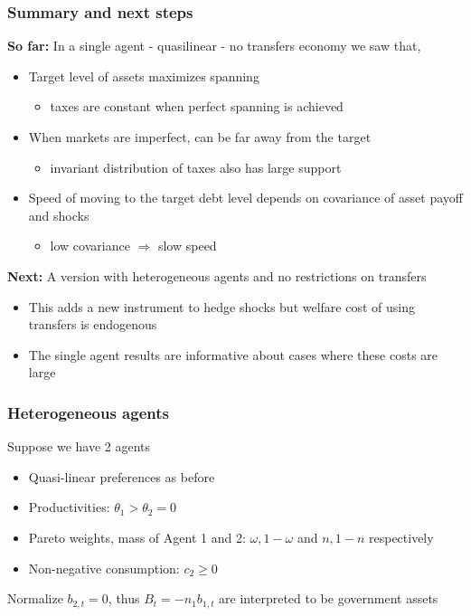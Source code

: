 \documentclass{beamer}
\begin{document}
\smallskip 
\begin{frame}%

\frametitle{Summary and next steps}

\smallskip

\textbf{So far:} In a single agent - quasilinear - no transfers economy we saw that,

\begin{itemize}
\item Target level of assets maximizes spanning
\begin{itemize}
\item taxes are constant when perfect spanning is achieved
\end{itemize}
\item When markets are imperfect, can be far away from the target
\begin{itemize}
\item invariant distribution of taxes also has large support
\end{itemize}
\item Speed of moving to the target debt level depends on covariance of
asset payoff and shocks

\begin{itemize}
\item low covariance $\Longrightarrow $ slow speed
\end{itemize}
\end{itemize}

\textbf{Next:} A version with heterogeneous agents and no restrictions on transfers
\begin{itemize}
\item This adds a new instrument to hedge shocks but welfare cost of using transfers is endogenous
\item The single agent results are informative about cases where these costs are large
\end{itemize}


\end{frame}%

\begin{frame}
\frametitle{Heterogeneous agents}
Suppose we have 2 agents

\begin{itemize}
\item Quasi-linear preferences as before
\item Productivities: $\theta_1>\theta _{2}=0$ 
\item Pareto weights, mass of Agent 1 and 2: $\omega,1-\omega$ and $n,1-n$ respectively
\item Non-negative consumption: $c_{2}\geq 0$
\end{itemize}

Normalize $b_{2,t}=0$, thus $B_t=-n_1b_{1,t}$ are interpreted to be government assets
\end{frame}
\end{document}
